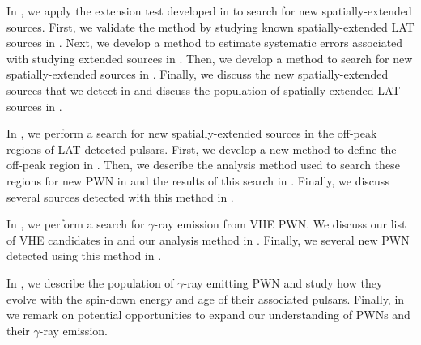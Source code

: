 In , we apply the extension test developed in
 to search for new spatially-extended sources.
First, we validate the method by studying known spatially-extended
\ac{LAT} sources in .  Next, we develop
a method to estimate systematic errors associated with studying
extended sources in .  Then,
we develop a method to search for new spatially-extended sources in
.  Finally, we discuss the new
spatially-extended sources that we detect in 
and discuss the population of spatially-extended \ac{LAT} sources in
.


In , we perform a search for new spatially-extended
sources in the off-peak regions of \ac{LAT}-detected pulsars.
First, we develop a new method to define the off-peak region in
.  Then, we describe the analysis method used to
search these regions for new \ac{PWN} in 
and the results of this search in .
Finally, we discuss several sources detected with this method in
.

In , we perform a search for $\gamma$-ray emission
from \ac{VHE} \ac{PWN}.  We discuss our list of \ac{VHE} candidates
in  and our analysis method
in .  Finally, we several new \ac{PWN}
detected using this method in .


In , we describe the population of $\gamma$-ray
emitting \ac{PWN} and study how they evolve with the spin-down energy
and age of their associated pulsars.  Finally, in 
we remark on potential opportunities to expand our understanding of
\acp{PWN} and their $\gamma$-ray emission.
